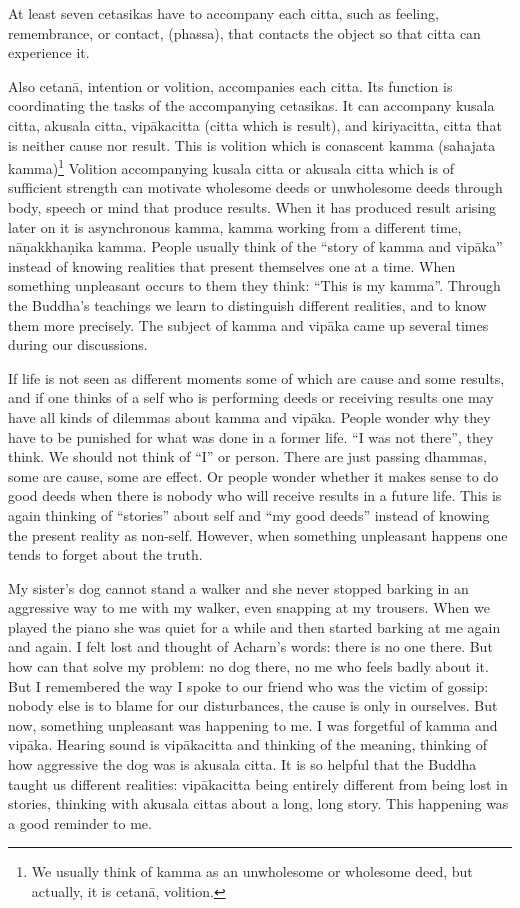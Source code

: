 \documentclass{book}
\begin{document}
At least seven cetasikas have to accompany
each citta, such as feeling, remembrance, or contact, (phassa), that
contacts the object so that citta can experience it. 

Also cetanā, intention or volition,
accompanies each citta. Its function is coordinating the tasks of the
accompanying cetasikas. It can accompany kusala citta, akusala citta,
vipākacitta (citta which is
result), and kiriyacitta, citta that is neither
cause nor result. This is volition which is conascent kamma (sahajata
kamma)\footnote{We
usually think of kamma as an unwholesome or wholesome deed, but
actually, it is cetanā, volition.} Volition
accompanying kusala citta or akusala citta which is of sufficient
strength can motivate wholesome deeds or unwholesome deeds through body,
speech or mind that produce results. When it has produced result arising
later on it is asynchronous kamma, kamma working from a different time,
nāṇakkhaṇika kamma. People
usually think of the ``story of kamma and vipāka'' instead of knowing
realities that present themselves one at a time. When something
unpleasant occurs to them they think: ``This is my kamma''. Through the
Buddha's teachings we learn to distinguish different realities, and to
know them more precisely. The subject of kamma and vipāka came up
several times during our discussions. 

If life is not seen as different moments
some of which are cause and some results, and if one thinks of a self
who is performing deeds or receiving results one may have all kinds of
dilemmas about kamma and vipāka. People wonder why they have to be
punished for what was done in a former life.
``I was not
there'', they think.
We should not think of
``I'' or person. There are
just passing dhammas, some are cause,
some are effect. Or people wonder whether it makes sense to
do good deeds when there is nobody who will receive results in a future
life. This is again thinking of ``stories'' about self and ``my good
deeds'' instead of knowing the present reality as non-self. However,
when something unpleasant happens one tends to forget about the truth.


My
sister's dog cannot stand a walker and
she never stopped barking in an aggressive way to me with my
walker, even snapping at my trousers.
When we played the piano she was quiet for a while and then started
barking at me again and again. I felt lost and thought of
Acharn's words: there is no one there.
But how can that solve my problem: no dog there, no me who feels badly
about it. But I remembered the way I spoke to our friend who was the
victim of gossip: nobody else is to blame for our disturbances, the
cause is only in ourselves. But now, something unpleasant was happening
to me. I was forgetful of kamma and
vipāka. Hearing sound is
vipākacitta and thinking of
the meaning, thinking of how aggressive the dog was is akusala citta. It
is so helpful that the Buddha taught us different realities:
vipākacitta being entirely
different from being lost in stories, thinking with akusala cittas about
a long, long story. This happening was a good reminder to me. 
\end{document}
